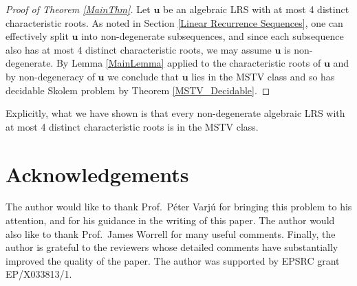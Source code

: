 \documentclass{article}\usepackage[a4paper,margin=20mm]{geometry}
\newcommand{\LRS}[1]{{\bm{#1}}}
\begin{document}
\begin{proof}[Proof of Theorem \ref{MainThm}]
	Let $\LRS{u}$ be an algebraic LRS with at most 4 distinct characteristic roots. As noted in Section \ref{Linear Recurrence Sequences}, one can effectively split $\LRS{u}$ into non-degenerate subsequences, and since each subsequence also has at most 4 distinct characteristic roots, we may assume $\LRS{u}$ is non-degenerate. By Lemma \ref{MainLemma} applied to the characteristic roots of $\LRS{u}$ and by non-degeneracy of $\LRS{u}$ we conclude that $\LRS{u}$ lies in the MSTV class and so has decidable Skolem problem by Theorem \ref{MSTV_Decidable}.
\end{proof} 
\begin{remark}
Explicitly, what we have shown is that every non-degenerate algebraic LRS with at most 4 distinct characteristic roots is in the MSTV class.
\end{remark}
\section*{Acknowledgements}
    The author would like to thank Prof.\ Péter Varjú for bringing this problem to his attention, and for his guidance in the writing of this paper. The author would also like to thank Prof.\ James Worrell for many useful comments. Finally, the author is grateful to the reviewers whose detailed comments have substantially improved the quality of the paper. The author was supported by EPSRC grant EP/X033813/1.

    
\end{document}
